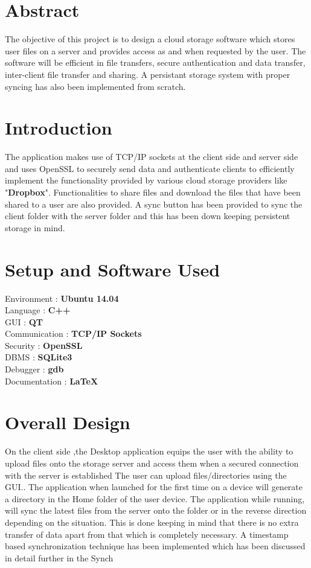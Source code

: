 \documentclass[11pt,fleqn]{book} %
\begin{document}
\section{Abstract}
The objective of this project is to design a cloud storage software which stores user files on a server and provides access as and when requested by the user. The software will be efficient in file transfers, secure authentication and data  transfer, inter-client file transfer and sharing. A persistant storage system with proper syncing has also been implemented from scratch.

\section{Introduction}

The application makes use of TCP/IP sockets at the client side and server side and uses OpenSSL to securely send data and authenticate clients to efficiently implement the functionality provided by various cloud storage providers like "\textbf{Dropbox}". Functionalities to share files and download the files that have been shared to a user are also provided. A sync button has been provided to sync the client folder with the server folder and this has been down keeping persistent storage in mind.

\section{Setup and Software Used}
Environment : \textbf{Ubuntu 14.04} 
\\Language : \textbf{C++}
\\GUI : \textbf{QT}
\\Communication : \textbf{TCP/IP Sockets}
\\Security : \textbf{OpenSSL}
\\DBMS     : \textbf{SQLite3}
\\Debugger : \textbf{gdb}
\\Documentation : \textbf{\LaTeX}


\section{Overall Design}

On the client side ,the Desktop application equips the user with the ability to upload files onto the storage server and access them when a secured connection with the server is established
 The user can upload files/directories using the GUI.. The application when launched for the first time on a device will generate a directory in the Home folder of the user device. The application while running, will sync the latest files from the server onto the folder or in the reverse direction depending on the situation. This is done keeping in mind that there is no extra transfer of data apart from that which is completely necessary. A timestamp based synchronization technique has been implemented which has been discussed in detail further in the Synch 
\end{document}
